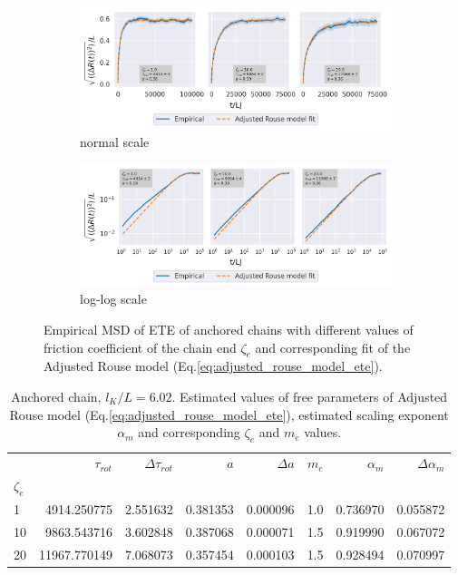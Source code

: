 \documentclass[
    paper=A4,pagesize=automedia,fontsize=12pt,
    BCOR=15mm,DIV=22,
    twoside,headinclude,footinclude=false,
    fleqn,             %
    bibliography=totocnumbered,          %
    listof=totoc,                %
    listof=flat,                 %
    cleardoublepage=empty      %
    numbers=endperiod
]{scrartcl}
\begin{document}
\begin{figure}
    \centering
    \begin{subfigure}[b]{\textwidth}
        \centering
        \includegraphics[width=\textwidth]{14+15+16-exp-msd-log-arm_fit.png}
        \caption{normal scale}
        \label{fig:msd_anchored_zeta-arm_fit-normal}
    \end{subfigure}
    \begin{subfigure}[b]{\textwidth}
        \centering
        \includegraphics[width=\textwidth]{14+15+16-exp-msd-log-arm_fit-log.png}
        \caption{log-log scale}
        \label{fig:msd_anchored_zeta-arm_fit-log}
    \end{subfigure}
    \caption{Empirical MSD of ETE of anchored chains with different values of
    friction coefficient of the chain end $\zeta_e$ and corresponding fit
    of the Adjusted Rouse model (Eq.\ref{eq:adjusted_rouse_model_ete}).
    }
    \label{fig:msd_anchored_zeta-arm_fit}
\end{figure}

\begin{table}
    \centering
    \begin{tabular}{lrrrrrrr}
        \toprule
         & $\tau_{rot}$ & $\Delta \tau_{rot}$ & $a$ & $\Delta a$ & $m_e$ & $\alpha_m$ & $\Delta \alpha_m $\\
        $\zeta_e$ &  &  &  &  &  &  &  \\
        \midrule
        1 & 4914.250775 & 2.551632 & 0.381353 & 0.000096 & 1.0 & 0.736970 & 0.055872 \\
        10 & 9863.543716 & 3.602848 & 0.387068 & 0.000071 & 1.5 & 0.919990 & 0.067072 \\
        20 & 11967.770149 & 7.068073 & 0.357454 & 0.000103 & 1.5 & 0.928494 & 0.070997 \\
        \bottomrule
    \end{tabular}
    \caption{
        Anchored chain, $l_K/L=6.02$. 
        Estimated values of free parameters of Adjusted Rouse model (Eq.\ref{eq:adjusted_rouse_model_ete}),
        estimated scaling exponent $\alpha_m$ and corresponding $\zeta_e$ and $m_e$ values.
    }
    \label{table:anchored_chain_zeta_estimations}
\end{table}
\end{document}

